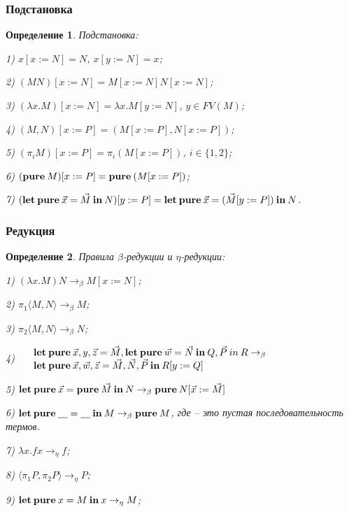 \documentclass[10pt,pdf,utf8,russian,aspectratio=169]{beamer}
\newtheorem{defin}{Определение}
\begin{document}
\begin{frame}
  \frametitle{Подстановка}

  \begin{defin} Подстановка:

  1) $x [x := N] = N$, $x [y := N] = x$;

  2) $(M N) [x := N] = M[x := N] N [x := N]$;

  3) $(\lambda x. M) [x := N] = \lambda x. M [y := N]$, $y \in FV(M)$;

  4) $(M, N)[x := P] = (M[x := P], N [x := P])$;

  5) $(\pi_i M) [x := P] = \pi_i (M[x := P])$, $i \in \{ 1, 2\}$;

  6) $({\bf pure \: } M) [x := P] = {\bf pure \: } (M [x := P])$;

  7) $({\bf let \: pure \:}\vec{x} = \vec{M} {\: \bf in \:} N) [y := P] = {\bf let \: pure \:} \vec{x} = (\vec{M} [y := P]) {\: \bf in \:} N$.
  \end{defin}

\end{frame}

\begin{frame}
  \frametitle{Редукция}

  \begin{defin} Правила $\beta$-редукции и $\eta$-редукции:

  1) $(\lambda x. M) N \rightarrow_{\beta} M [x := N]$;

  2) $\pi_1 \langle M, N \rangle \rightarrow_{\beta} M$;

  3) $\pi_2 \langle M, N \rangle \rightarrow_{\beta} N$;

  4) $\begin{array}{llll}
  & {\bf let \: pure \:} \vec{x}, y, \vec{z} = \vec{M}, {\bf let \: pure \: } \vec{w} = \vec{N} {\: \bf in \: } Q, \vec{P} {\: in \:} R \rightarrow_{\beta} & \\
  & {\bf let \: pure \:} \vec{x}, \vec{w}, \vec{z} = \vec{M}, \vec{N}, \vec{P} {\: \bf in \: } R [y := Q]
  \end{array}$

  5) ${\bf let \: pure \:} \vec{x} = {\bf pure \:} \vec{M} {\: \bf in \:} N \rightarrow_{\beta} {\bf pure \:} N [\vec{x} := \vec{M}]$

  6) ${\bf let \: pure \:} \underline{\quad} = \underline{\quad} {\: \bf in \:} M \rightarrow_{\beta} {\bf pure \:} M$, где \underline{\quad} -- это пустая последовательность термов.

  7) $\lambda x. f x \rightarrow_{\eta} f$;

  8) $\langle \pi_1 P, \pi_2 P \rangle \rightarrow_{\eta} P$;

  9) ${\bf let \: pure \:} x = M {\: \bf in \: } x \rightarrow_{\eta} M$;

  \end{defin}

\end{frame}
\end{document}
